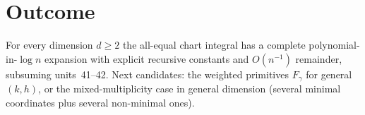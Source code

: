 \documentclass[11pt]{article}
\begin{document}
\section{Outcome}
For every dimension $d\ge2$ the all-equal chart integral has a complete polynomial-in-$\log n$
expansion with explicit recursive constants and $O(n^{-1})$ remainder, subsuming units~41--42. Next
candidates: the weighted primitives $F_\gamma$ for general $(k,h)$, or the mixed-multiplicity case in
general dimension (several minimal coordinates plus several non-minimal ones).
\end{document}
